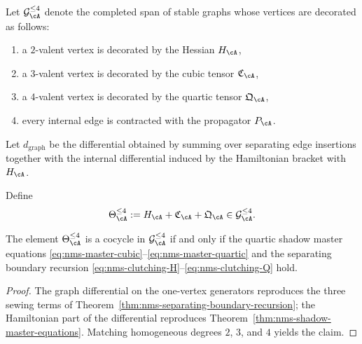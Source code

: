 \begin{definition}
\label{def:nms-shadow-graph-complex}
Let $\mathcal G_{\cA}^{\le 4}$ denote the completed span of stable graphs whose vertices are decorated as follows:
\begin{enumerate}[label=\textup{(\roman*)}]
\item a $2$-valent vertex is decorated by the Hessian $H_{\cA}$,
\item a $3$-valent vertex is decorated by the cubic tensor $\mathfrak C_{\cA}$,
\item a $4$-valent vertex is decorated by the quartic tensor $\mathfrak Q_{\cA}$,
\item every internal edge is contracted with the propagator $P_{\cA}$.
\end{enumerate}
Let $d_{\mathrm{graph}}$ be the differential obtained by summing over separating edge insertions together with the internal differential induced by the Hamiltonian bracket with $H_{\cA}$.
\end{definition}

\begin{construction}
\label{constr:nms-shadow-cocycle}
Define
\begin{equation}
\label{eq:nms-shadow-cocycle}
\Theta_{\cA}^{\le 4}
:=
H_{\cA}+\mathfrak C_{\cA}+\mathfrak Q_{\cA}
\in \mathcal G_{\cA}^{\le 4}.
\end{equation}
\end{construction}

\begin{theorem}
\label{thm:nms-shadow-cocycle-characterization}
The element $\Theta_{\cA}^{\le 4}$ is a cocycle in $\mathcal G_{\cA}^{\le 4}$ if and only if the quartic shadow master equations \eqref{eq:nms-master-cubic}--\eqref{eq:nms-master-quartic} and the separating boundary recursion \eqref{eq:nms-clutching-H}--\eqref{eq:nms-clutching-Q} hold.
\end{theorem}

\begin{proof}
The graph differential on the one-vertex generators reproduces the three sewing terms of Theorem~\ref{thm:nms-separating-boundary-recursion}; the Hamiltonian part of the differential reproduces Theorem~\ref{thm:nms-shadow-master-equations}. Matching homogeneous degrees $2$, $3$, and $4$ yields the claim.\qedhere
\end{proof}

